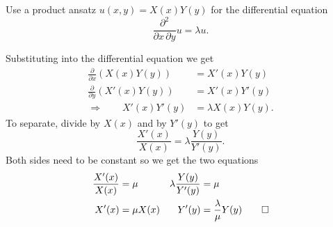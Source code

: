 Use a product ansatz $u(x,y) = X(x)Y(y)$ 
for the differential equation
\[
\frac{\partial^2}{\partial x\, \partial y} u
=
\lambda u.
\]

\begin{loesung}
Substituting into the differential equation we get
\begin{align*}
\frac{\partial}{\partial x} (X(x)Y(y))
&=
X'(x) Y(y)
\\
\frac{\partial}{\partial y} (X'(x)Y(y))
&=
X'(x)Y'(y)
\\
\Rightarrow\qquad
X'(x) Y'(y) &= \lambda X(x) Y(y).
\end{align*}
To separate, divide by $X(x)$ and by $Y'(y)$ to get
\[
\frac{X'(x)}{X(x)}
=
\lambda
\frac{Y(y)}{Y'(y)}.
\]
Both sides need to be constant so we get the two equations
\begin{align*}
\frac{X'(x)}{X(x)}&=\mu
&
\lambda\frac{Y(y)}{Y'(y)}&=\mu
\\
X'(x)&=\mu X(x)
&
Y'(y)&=\frac{\lambda}{\mu}Y(y)
\qedhere
\end{align*}
\end{loesung}

